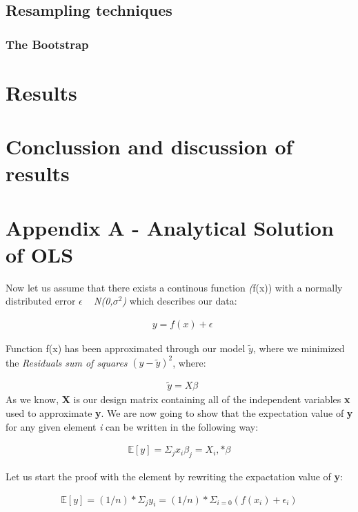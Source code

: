 \documentclass[a4paper, 10pt]{article}
\begin{document}
\subsection{Resampling techniques}

\subsubsection{The Bootstrap}


\section{Results}

\section{Conclussion and discussion of results}


\section{Appendix A - Analytical Solution of OLS}
Now let us assume that there exists a continous function \emph(f(x)) with a normally distributed error $\epsilon$ ~ \emph{N(0,$\sigma^2$)} which describes our data: 

\begin{gather*}
	\textbf{ $y=f(x) + \epsilon$}
\end{gather*}

Function f(x) has been approximated through our model \textbf{$\tilde{y}$}, where we minimized the \emph{Residuals sum of squares} \textbf{$(y-\tilde{y})^2$}, where: 

\begin{gather*}
	\textbf{ $\tilde{y}=X\beta$}
\end{gather*}
As we know, \textbf{X} is our design matrix containing all of the independent variables \textbf{x} used to approximate \textbf{y}. We are now going to show that the expectation value of \textbf{y} for any given element \emph{i} can be written in the following way: 

\begin{gather*}
	\mathbb{E}[y] = \Sigma_{j} x_{i} \beta_{j} = X_i,* \beta 
\end{gather*}

Let us start the proof with the element by rewriting the expactation value of \textbf{y}:

\begin{gather*}
	\mathbb{E}[y] = (1/n)*\Sigma_{j} y_{i} = (1/n)*\Sigma_{i=0} (f(x_i) + \epsilon_i) 
\end{gather*}
\end{document}

